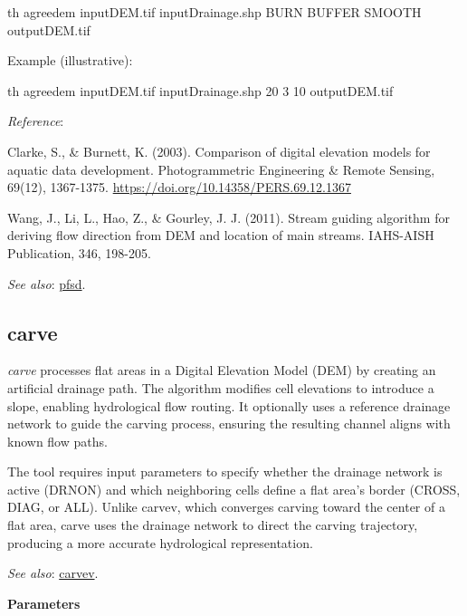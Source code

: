 \documentclass[
]{book}
\newenvironment{Shaded}{\begin{snugshade}}{\end{snugshade}}
\newcommand{\ExtensionTok}[1]{#1}
\newcommand{\NormalTok}[1]{#1}
\theoremstyle{definition}
\theoremstyle{definition}
\theoremstyle{definition}
\theoremstyle{definition}
\theoremstyle{remark}
\begin{document}
\begin{Shaded}
\begin{Highlighting}[]
\ExtensionTok{th}\NormalTok{ agreedem inputDEM.tif inputDrainage.shp BURN BUFFER SMOOTH outputDEM.tif}
\end{Highlighting}
\end{Shaded}

Example (illustrative):

\begin{Shaded}
\begin{Highlighting}[]
\ExtensionTok{th}\NormalTok{ agreedem inputDEM.tif inputDrainage.shp 20 3 10 outputDEM.tif}
\end{Highlighting}
\end{Shaded}

\emph{Reference}:

Clarke, S., \& Burnett, K. (2003). Comparison of digital elevation models for aquatic data development. Photogrammetric Engineering \& Remote Sensing, 69(12), 1367-1375. \url{https://doi.org/10.14358/PERS.69.12.1367}

Wang, J., Li, L., Hao, Z., \& Gourley, J. J. (2011). Stream guiding algorithm for deriving flow direction from DEM and location of main streams. IAHS-AISH Publication, 346, 198-205.

\emph{See also}: \hyperref[pfsd]{pfsd}.

\subsection{carve}\label{carve}

\emph{carve} processes flat areas in a Digital Elevation Model (DEM) by creating an artificial drainage path. The algorithm modifies cell elevations to introduce a slope, enabling hydrological flow routing. It optionally uses a reference drainage network to guide the carving process, ensuring the resulting channel aligns with known flow paths.

The tool requires input parameters to specify whether the drainage network is active (DRNON) and which neighboring cells define a flat area's border (CROSS, DIAG, or ALL). Unlike carvev, which converges carving toward the center of a flat area, carve uses the drainage network to direct the carving trajectory, producing a more accurate hydrological representation.

\emph{See also}: \hyperref[carvev]{carvev}.

\textbf{Parameters}
\end{document}
